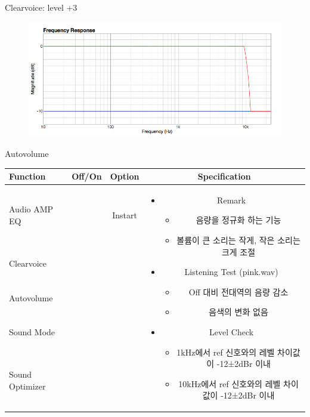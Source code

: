\documentclass{beamer}
\begin{document}
\begin{frame}[t]{Clearvoice: level +3}
\begin{figure}[b]
\includegraphics[height=0.32\textwidth]{figure/cv3.png}
\end{figure}

\end{frame}


\begin{frame}[t]{Autovolume}
\begin{tiny}
\begin{tabular}{@{}lccc@{}}
\toprule
Function & Off/On & Option & Specification \\
\midrule
Audio AMP EQ & \color{black}{Off} & Instart &
\multirow{14}{60mm}{
\begin{itemize}
\item Remark
	\begin{itemize}
	\item 음량을 정규화 하는 기능
	\item 볼륨이 큰 소리는 작게, 작은 소리는 크게 조절
	\end{itemize}
\item Listening Test (pink.wav)
	\begin{itemize}
	\item Off 대비 전대역의 음량 감소
	\item 음색의 변화 없음
	\end{itemize}
\item Level Check
  \begin{itemize}
  \item 1kHz에서 ref 신호와의 레벨 차이값이 -12±2dBr 이내
  \item 10kHz에서 ref 신호와의 레벨 차이값이 -12±2dBr 이내
  \end{itemize}
\end{itemize}
} \\
Clearvoice & \color{black}{Off} & & \\
Autovolume & \color{blue}{On} & & \\
Sound Mode & \color{black}{Off} & & \\
Sound Optimizer & \color{black}{Off} & & \\

\end{tabular}
\end{tiny}
\end{frame}
\end{document}
